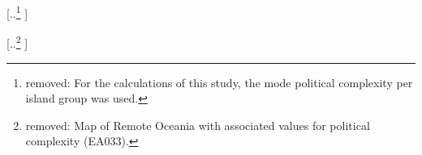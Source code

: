 \documentclass[unnumsec,webpdf,modern,medium]{oup-authoring-template}
\providecommand{\DIFdeltex}[1]{{\protect\color{red} [..\footnote{removed: #1} ]}} %
\providecommand{\DIFdelbegin}{} %
\providecommand{\DIFdelend}{} %
\providecommand{\DIFdel}[1]{\texorpdfstring{\DIFdeltex{#1}}{}} %
\newcommand{\DIFscaledelfig}{0.5}
\newlength{\DIFdelgraphicswidth} %
\newlength{\DIFdelgraphicsheight} %
\newcommand{\DIFdelincludegraphics}[2][]{%
\sbox{\DIFdelgraphicsbox}{\DIFOincludegraphics[#1]{#2}}%
\settoboxwidth{\DIFdelgraphicswidth}{\DIFdelgraphicsbox} %
\settoboxtotalheight{\DIFdelgraphicsheight}{\DIFdelgraphicsbox} %
\scalebox{\DIFscaledelfig}{%
\parbox[b]{\DIFdelgraphicswidth}{\usebox{\DIFdelgraphicsbox}\\[-\baselineskip] \rule{\DIFdelgraphicswidth}{0em}}\llap{\resizebox{\DIFdelgraphicswidth}{\DIFdelgraphicsheight}{%
\setlength{\unitlength}{\DIFdelgraphicswidth}%
\begin{picture}(1,1)%
\thicklines\linethickness{2pt} %
{\color[rgb]{1,0,0}\put(0,0){\framebox(1,1){}}}%
{\color[rgb]{1,0,0}\put(0,0){\line( 1,1){1}}}%
{\color[rgb]{1,0,0}\put(0,1){\line(1,-1){1}}}%
\end{picture}%
}\hspace*{3pt}}} %
} %
\DeclareRobustCommand{\DIFdelbegin}{\DIFOdelbegin \let\includegraphics\DIFdelincludegraphics} %
\DeclareRobustCommand{\DIFdelend}{\DIFOaddend \let\includegraphics\DIFOincludegraphics} %
\begin{document}
\DIFdelbegin \DIFdel{For the calculations of this study, the mode political complexity per island group was used. 
}\DIFdelend %

\DIFdelbegin %
{%
\DIFdel{Map of Remote Oceania with associated values for political complexity (EA033).}%
}
\DIFdelend %

\DIFdelbegin %
\end{document}
